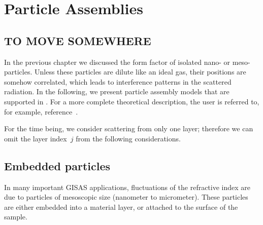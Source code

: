 

\chapter{Particle Assemblies}  \label{sec:Assemblies}


\section{TO MOVE SOMEWHERE}

In the previous chapter we discussed the form factor of isolated
nano- or meso-particles.
Unless these particles are dilute like an ideal gas,
their positions are somehow correlated,
which leads to interference patterns in the scattered radiation.
In the following,
we present particle assembly models that are supported in \BornAgain.
For a more complete theoretical description,
the user is referred to, for example, reference~\cite{ReLL09}.


For the time being,
we consider scattering from only one layer;
therefore we can omit the layer index~$j$ from the following considerations.

\section{Embedded particles}

%
%
%
In many important GISAS applications,
fluctuations of the refractive index are due to particles
of mesoscopic size (nanometer to micrometer).
These particles are either embedded into a material layer,
or attached to the surface of the sample.

